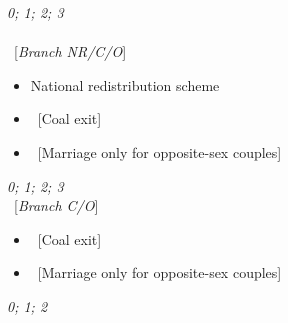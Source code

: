 \begin{enumerate}[resume]
\begin{itemize}
\end{itemize}
\textit{0; 1; 2; 3}\\
\\
~[\textit{Branch NR/C/O}] \\
\begin{itemize}  \vspace{-1em}
    \item National redistribution scheme 
    \item ~[Coal exit]  
    \item ~[Marriage only for opposite-sex couples]
\end{itemize}
\textit{0; 1; 2; 3}
\\
~[\textit{Branch C/O}] \\
\begin{itemize}  \vspace{-1em}
    \item ~[Coal exit]  
    \item ~[Marriage only for opposite-sex couples]
\end{itemize}
\textit{0; 1; 2}\\
\end{enumerate}

